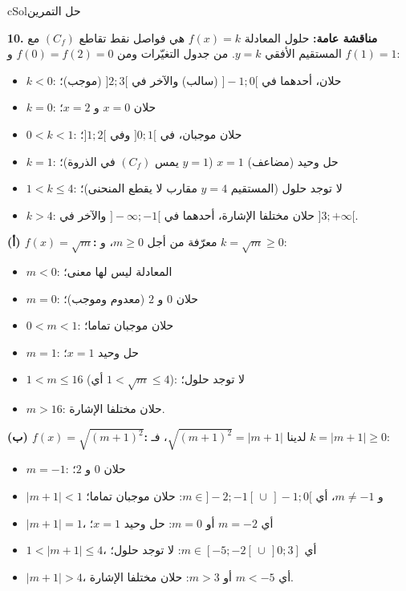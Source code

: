 \documentclass[12pt,a4paper]{article}
\newcounter{exo}
\newenvironment{hal}{\Needspace{12\baselineskip}\begin{otherlanguage}{english}\begin{arbox}[breakable]{cSol}{حل التمرين \theexo}}{\end{arbox}\end{otherlanguage}}
\newcommand{\QQ}[1]{\par\smallskip\textbf{#1.} }
\begin{document}
\begin{hal}
\QQ{10} \textbf{مناقشة عامة:} حلول المعادلة $f(x)=k$ هي فواصل نقط تقاطع $(C_f)$ مع المستقيم الأفقي $y=k$. من جدول التغيّرات ومن $f(0)=f(2)=0$ و $f(1)=1$:
\begin{itemize}
\item $k<0$: حلان، أحدهما في $]-1;0[$ (سالب) والآخر في $]2;3[$ (موجب)؛
\item $k=0$: حلان $x=0$ و $x=2$؛
\item $0<k<1$: حلان موجبان، في $]0;1[$ وفي $]1;2[$؛
\item $k=1$: حل وحيد (مضاعف) $x=1$ ($y=1$ يمس $(C_f)$ في الذروة)؛
\item $1<k\leqslant4$: لا توجد حلول (المستقيم $y=4$ مقارب لا يقطع المنحنى)؛
\item $k>4$: حلان مختلفا الإشارة، أحدهما في $]-\infty;-1[$ والآخر في $]3;+\infty[$.
\end{itemize}

\textbf{(أ) $f(x)=\sqrt m$:} معرّفة من أجل $m\geqslant0$، و $k=\sqrt m\geqslant0$:
\begin{itemize}
\item $m<0$: المعادلة ليس لها معنى؛
\item $m=0$: حلان $0$ و $2$ (معدوم وموجب)؛
\item $0<m<1$: حلان موجبان تماما؛
\item $m=1$: حل وحيد $x=1$؛
\item $1<m\leqslant16$ (أي $1<\sqrt m\leqslant4$): لا توجد حلول؛
\item $m>16$: حلان مختلفا الإشارة.
\end{itemize}

\textbf{(ب) $f(x)=\sqrt{(m+1)^{2}}$:} لدينا $\sqrt{(m+1)^{2}}=|m+1|$، فـ $k=|m+1|\geqslant0$:
\begin{itemize}
\item $m=-1$: حلان $0$ و $2$؛
\item $|m+1|<1$ و $m\neq-1$، أي $m\in]-2;-1[\,\cup\,]-1;0[$: حلان موجبان تماما؛
\item $|m+1|=1$، أي $m=-2$ أو $m=0$: حل وحيد $x=1$؛
\item $1<|m+1|\leqslant4$، أي $m\in[-5;-2[\,\cup\,]0;3]$: لا توجد حلول؛
\item $|m+1|>4$، أي $m<-5$ أو $m>3$: حلان مختلفا الإشارة.
\end{itemize}


\end{hal}
\end{document}
